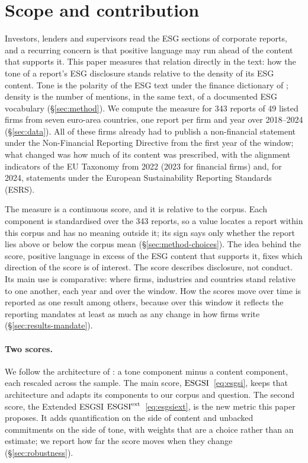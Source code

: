 \section{Scope and contribution}
\label{sec:scope}

Investors, lenders and supervisors read the ESG sections of
corporate reports, and a recurring concern is that positive language may run
ahead of the content that supports it. This paper measures that relation
directly in the text: how the tone of a report's ESG disclosure stands relative
to the density of its ESG content. Tone is the polarity of the ESG text under
the finance dictionary of \citet{loughran2011}; density is the number of
mentions, in the same text, of a documented ESG vocabulary
(\S\ref{sec:method}). We compute the measure for 343 reports of 49 listed
firms from seven euro-area countries, one report per firm and year over
2018--2024 (\S\ref{sec:data}). All of these firms already had to publish a
non-financial statement under the Non-Financial Reporting Directive from the
first year of the window; what changed was how much of its content was
prescribed, with the alignment indicators of the EU Taxonomy from 2022 (2023
for financial firms) and, for 2024, statements under the European
Sustainability Reporting Standards (ESRS).

The measure is a continuous score, and it is relative to the corpus. Each
component is standardised over the 343 reports, so a value locates a report
within this corpus and has no meaning outside it; its sign says only whether
the report lies above or below the corpus mean (\S\ref{sec:method-choices}).
The idea behind the score, positive language in excess of the ESG content that
supports it, fixes which direction of the score is of interest. The score
describes disclosure, not conduct. Its main use is comparative: where firms,
industries and countries stand relative to one another, each year and over the
window. How the scores move over time is reported as one result among others,
because over this window it reflects the reporting mandates at least as much
as any change in how firms write (\S\ref{sec:results-mandate}).

\paragraph{Two scores.} We follow the architecture of \citet{lagasio2024}:
a tone component minus a content component, each rescaled across the sample.
The main score, $\mathrm{ESGSI}$~\eqref{eq:esgsi}, keeps that architecture and adapts
its components to our corpus and question. The second score, the Extended
ESGSI $\mathrm{ESGSI}^{\mathrm{ext}}$~\eqref{eq:esgsiext}, is the new metric this paper proposes.
It adds quantification on the side of content and unbacked commitments on the
side of tone, with weights that are a choice rather than an estimate; we report
how far the score moves when they change (\S\ref{sec:robustness}).

